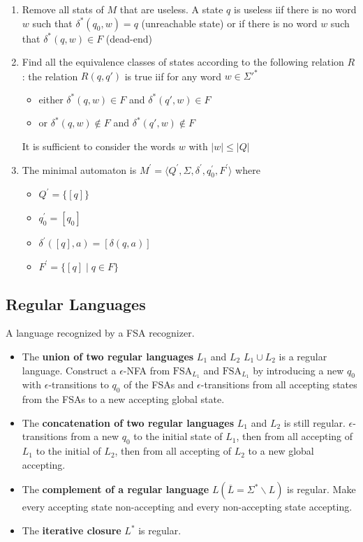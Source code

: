 \documentclass[9pt, twocolumn]{extarticle}
\newcommand{\definition}[2]{%
  \begin{definitionbox}{\titlecap{#1}}
    #2
  \end{definitionbox}
}
\begin{document}
\begin{enumerate}
  \item Remove all stats of $M$ that are useless. A state $q$ is useless iif there is no word $w$ such that $\delta^*(q_0,w)=q$ (unreachable state) or if there is no word $w$ such that $\delta^*(q,w)\in F$ (dead-end)
  \item Find all the equivalence classes of states according to the following relation $R$: the relation $R(q,q')$ is true iif for any word $w\in\Sigma'^*$
        \begin{itemize}
          \item either $\delta^*(q,w)\in F$ and $\delta^*(q',w)\in F$
          \item or $\delta^*(q,w)\notin F$ and $\delta^*(q',w)\notin F$
        \end{itemize}
        It is sufficient to consider the words $w$ with $|w|\leq |Q|$
  \item The minimal automaton is $M^{\prime}=\langle Q^{\prime}, \Sigma, \delta^{\prime}, q_0^{\prime}, F^{\prime}\rangle$ where
        \begin{itemize}
          \item $Q^{\prime}=\{[q]\}$
          \item $q_0^{\prime}=[q_0]$
          \item $\delta^{\prime}([q], a)=[\delta(q, a)]$
          \item $F^{\prime}=\{[q] \mid q \in F\}$
        \end{itemize}
\end{enumerate}

\subsection{Regular Languages}
\definition{Regular Language}{A language recognized by a FSA recognizer.}
\begin{itemize}
  \item The \textbf{union of two regular languages} $L_1$ and $L_2$ $L_1\cup L_2$ is a regular language. Construct a $\epsilon$-NFA from $\text{FSA}_{L_1}$ and $\text{FSA}_{L_1}$ by introducing a new $q_0$ with $\epsilon$-transitions to $q_0$ of the FSAs and $\epsilon$-transitions from all accepting states from the FSAs to a new accepting global state.
  \item The \textbf{concatenation of two regular languages} $L_1$ and $L_2$ is still regular. $\epsilon$-transitions from a new $q_0$ to the initial state of $L_1$, then from all accepting of $L_1$ to the initial of $L_2$, then from all accepting of $L_2$ to a new global accepting.
  \item The \textbf{complement of a regular language} $L (\overline{L}=\Sigma^*\backslash L)$ is regular. Make every accepting state non-accepting and every non-accepting state accepting.
  \item The \textbf{iterative closure} $L^*$ is regular.
\end{itemize}
\end{document}
